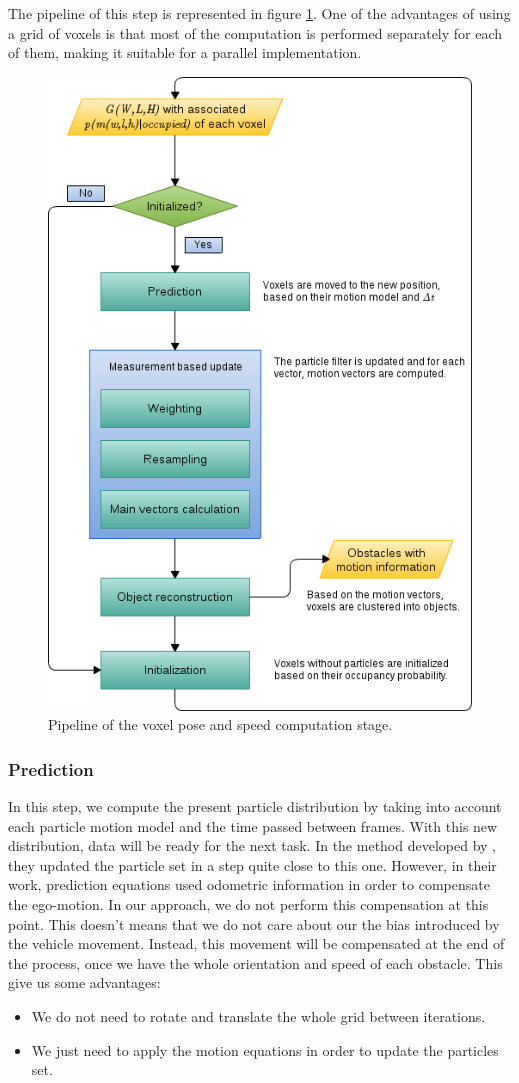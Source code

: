 The pipeline of this step is represented in figure \ref{fig:cp05_voxel_pose_speed_computation}. One of the advantages of using a grid of voxels is that most of the computation is performed separately for each of them, making it suitable for a parallel implementation. 

\begin{figure}[h!]
  \centering
  \includegraphics[width=\textwidth, height=\textwidth]{voxelPoseAndSpeedComputation}
  \caption{Pipeline of the voxel pose and speed computation stage.}\label{fig:cp05_voxel_pose_speed_computation}
\end{figure}

\subsubsection{Prediction}\label{ch:chapter05_01_04_01}

In this step, we compute the present particle distribution by taking into account each particle motion model and the time passed between frames. With this new distribution, data will be ready for the next task. In the method developed by \cite{danescu2012particle}, they updated the particle set in a step quite close to this one. However, in their work, prediction equations used odometric information in order to compensate the ego-motion. In our approach, we do not perform this compensation at this point. This doesn't means that we do not care about our the bias introduced by the vehicle movement. Instead, this movement will be compensated at the end of the process, once we have the whole orientation and speed of each obstacle. This give us some advantages:
\begin{itemize}
 \item We do not need to rotate and translate the whole grid between iterations.
 \item We just need to apply the motion equations in order to update the particles set.
\end{itemize}

